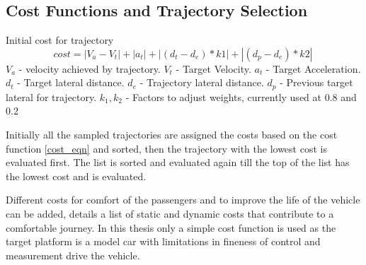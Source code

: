 



\subsection{Cost Functions and Trajectory Selection} \label{traj_Selection}

Initial cost for trajectory
\begin{equation}
cost = |V_a - V_t| + |a_t| + | (d_t - d_e)*k1 | + | (d_p - d_e)*k2 |\
\label{cost_eqn}
\end{equation}
$V_a$ - velocity achieved by trajectory.
$V_t$ - Target Velocity.
$a_t$ - Target Acceleration.
$d_t$ - Target lateral distance.
$d_e$ - Trajectory lateral distance.
$d_p$ - Previous target lateral for trajectory.
$k_1,k_2$ - Factors to adjust weights, currently used at 0.8 and 0.2


Initially all the sampled trajectories are assigned the costs based on the cost function \ref{cost_eqn} and sorted, then the trajectory with the lowest cost is evaluated first. The list is sorted and evaluated again till the top of the list has the lowest cost and is evaluated.

Different costs for comfort of the passengers and to improve the life of the vehicle can be added, \cite{traj_planner_optimization} details a list of static and dynamic costs that contribute to a comfortable journey. In this thesis only a simple cost function is used as the target platform is a model car with limitations in fineness of control and measurement drive the vehicle. 

